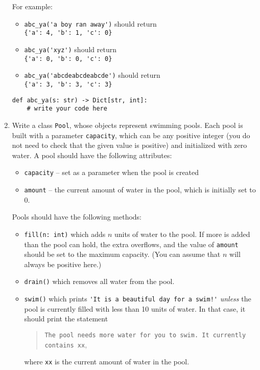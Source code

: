 \documentclass{article}
\begin{document}
\begin{enumerate}
    For example:
    \begin{itemize}
      \item \verb|abc_ya('a boy ran away')| should return\\  \verb|{'a': 4, 'b': 1, 'c': 0}|
      \item \verb|abc_ya('xyz')| should return \\ \verb|{'a': 0, 'b': 0, 'c': 0}|
      \item \verb|abc_ya('abcdeabcdeabcde')| should return \\ \verb|{'a': 3, 'b': 3, 'c': 3}|
    \end{itemize}

    \vspace{0.3in}

\begin{verbatim}
def abc_ya(s: str) -> Dict[str, int]:
    # write your code here

\end{verbatim}
\newpage
\item Write a class \verb|Pool|, whose objects represent swimming pools. Each pool is built with a parameter \verb|capacity|, which can be any positive integer (you do not need to check that the given value is positive) and initialized with zero water. A pool should have the following attributes:
    \begin{itemize}
      \item \verb|capacity| -- set as a parameter when the pool is created
      \item \verb|amount| -- the current amount of water in the pool, which is initially set to 0.
    \end{itemize}

    Pools should have the following methods:
    \begin{itemize}
      \item \verb|fill(n: int)| which adds $n$ units of water to the pool. If more is added than the pool can hold, the extra overflows, and the value of \verb|amount| should be set to the maximum capacity. (You can assume that $n$ will always be positive here.)
      \item \verb|drain()| which removes all water from the pool.
      \item \verb|swim()| which prints %
        \verb|'It is a beautiful day for a swim!'| \emph{unless} the
        pool is currently filled with less than 10 units of water. In
        that case, it should print the statement
        \begin{quote}
        \texttt{The pool needs more water for you to swim. It currently contains xx},
        \end{quote}
        where \verb|xx| is the current amount of water in the pool.
    \end{itemize}


\end{enumerate}
\end{document}
